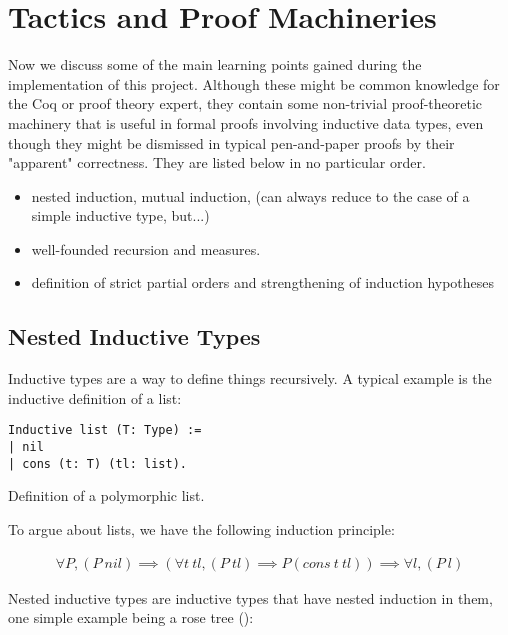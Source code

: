 \chapter{Tactics and Proof Machineries}
\label{ch:machineries}
Now we discuss some of the main learning points gained during the implementation
of this project. Although these might be common knowledge for the Coq or proof
theory expert, they contain some non-trivial proof-theoretic machinery that is
useful in formal proofs involving inductive data types, even though they might
be dismissed in typical pen-and-paper proofs by their "apparent" correctness.
They are listed below in no particular order.

\begin{itemize}
  \item nested induction, mutual induction, (can always reduce to the case of a
  simple inductive type, but...)
  \item well-founded recursion and measures.
  \item definition of strict partial orders and strengthening of induction
  hypotheses 
\end{itemize}

\section{Nested Inductive Types}

Inductive types are a way to define things recursively. A typical example is the
inductive definition of a list:

\begin{listing}[H]
\begin{verbatim}
Inductive list (T: Type) :=
| nil
| cons (t: T) (tl: list).
\end{verbatim}
  \caption{Definition of a polymorphic list.}
  \label{lst:def-list}
\end{listing}

To argue about lists, we have the following induction principle:

\begin{align*}
  \forall P, (P\ nil) \implies (\forall t\ tl, (P\ tl) \implies P (cons\ t\ tl))
  \implies \forall l, (P\ l)
\end{align*}

Nested inductive types
are inductive types that have nested induction in them, one simple example being
a rose tree (\cite{meertens1988first}):


